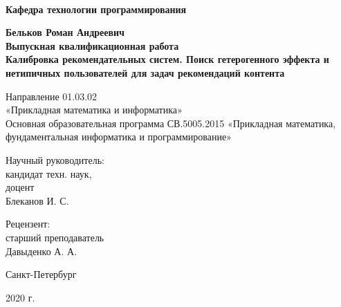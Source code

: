 
\begin{titlepage}
\begin{center}
\\
\textbf{Кафедра технологии программирования}

\vspace{22mm}

\textbf{\Large Бельков Роман Андреевич} \\[7mm]
\textbf{\large Выпускная квалификационная работа}\\[12mm]
\textbf{\Large Калибровка рекомендательных систем. Поиск гетерогенного эффекта и нетипичных пользователей для задач рекомендаций контента}

\vspace{12mm}
Направление 01.03.02 \\«Прикладная математика и информатика»\\
Основная образовательная программа СВ.5005.2015
«Прикладная математика, фундаментальная информатика и программирование»\\

\vspace{18mm}

\begin{flushleft}
{\setlength{\leftskip}{22em}
 {Научный руководитель:} \\
 кандидат техн. наук, \\
 доцент \\ Блеканов И. С. \\
}
\end{flushleft}
\begin{flushleft}
    \setlength{\leftskip}{22em}
    {Рецензент:} \\
    старший преподаватель \\ Давыденко А. А.
    \end{flushleft}
\vfill

{Санкт-Петербург}
\par{2020 г.}
\end{center}
\end{titlepage}
\restoregeometry
\addtocounter{page}{1}